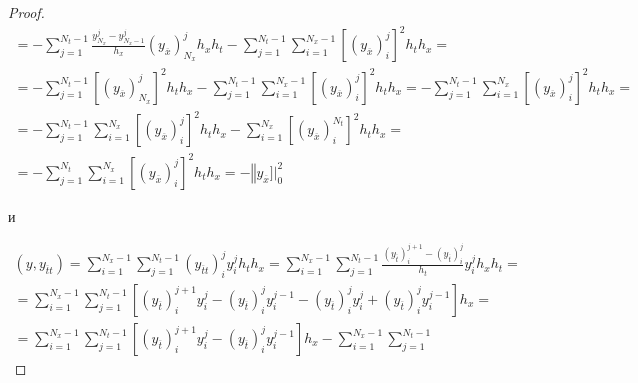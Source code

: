 \begin{proof}
\begin{multline}
=-\sum\limits_{j=1}^{N_t-1}\frac{y_{N_x}^{j}- y_{N_x-1}^{j}}{h_x}(y_{\overline{x}})_{N_x}^{j} h_x h_t-\sum\limits_{j=1}^{N_t-1}\sum\limits_{i=1}^{N_x-1}\left[(y_{\overline{x}})_{i}^{j} \right]^2 h_t h_x=

\\

=-\sum\limits_{j=1}^{N_t-1}\left[\left(y_{\overline{x}}\right)_{N_x}^{j}\right]^2 h_t h_x-\sum\limits_{j=1}^{N_t-1}\sum\limits_{i=1}^{N_x-1}\left[(y_{\overline{x}})_{i}^{j} \right]^2 h_t h_x=-\sum\limits_{j=1}^{N_t-1}\sum\limits_{i=1}^{N_x}\left[(y_{\overline{x}})_{i}^{j} \right]^2 h_t h_x=

\\

=-\sum\limits_{j=1}^{N_t-1}\sum\limits_{i=1}^{N_x}\left[(y_{\overline{x}})_{i}^{j} \right]^2 h_t h_x-\sum\limits_{i=1}^{N_x}\left[(y_{\overline{x}})_{i}^{N_t} \right]^2 h_t h_x 

=

\\

=-\sum\limits_{j=1}^{N_t}\sum\limits_{i=1}^{N_x}\left[(y_{\overline{x}})_{i}^{j} \right]^2 h_t h_x=-\left\Vert y_{\overline{x}}\right.]|_{0}^{2}

\end{multline}

и

\begin{multline}

\left(y,y_{\overline{t}t}\right)=\sum\limits_{i=1}^{N_x-1}\sum\limits_{j=1}^{N_t-1}

\left(y_{\overline{t}t}\right)_{i}^{j} y_{i}^{j} h_t h_x=

\sum\limits_{i=1}^{N_x-1}\sum\limits_{j=1}^{N_t-1} \frac{(y_{\overline{t}})_{i}^{j+1}-(y_{\overline{t}})_{i}^{j}}{h_t} y_{i}^{j} h_x h_t=

\\

=\sum\limits_{i=1}^{N_x-1}\sum\limits_{j=1}^{N_t-1}\left[(y_{\overline{t}})_{i}^{j+1} y_{i}^{j}

-(y_{\overline{t}})_{i}^{j} y_{i}^{j-1}-(y_{\overline{t}})_{i}^{j}  y_{i}^{j}

+(y_{\overline{t}})_{i}^{j}y_{i}^{j-1}\right] h_x=

\\

=\sum\limits_{i=1}^{N_x-1}\sum\limits_{j=1}^{N_t-1}\left[(y_{\overline{t}})_{i}^{j+1} y_{i}^{j}

-(y_{\overline{t}})_{i}^{j} y_{i}^{j-1}\right]h_x-\sum\limits_{i=1}^{N_x-1}\sum\limits_{j=1}^{N_t-1}


\end{multline}
\end{proof}
